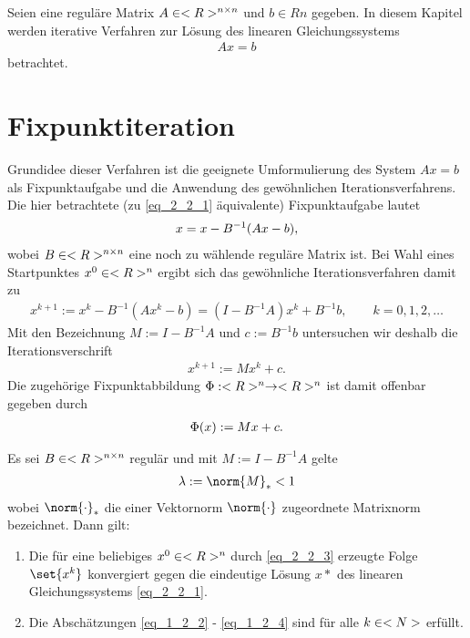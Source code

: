 Seien eine reguläre Matrix $A \in <R>^{n \times n}$ und $b \in Rn$ gegeben. In diesem Kapitel werden iterative Verfahren zur Lösung des linearen Gleichungssystems
\begin{align}
Ax = b\label{eq_2_2_1}
\end{align}
betrachtet.
\section{Fixpunktiteration}

Grundidee dieser Verfahren ist die geeignete Umformulierung des System $Ax = b$ als Fixpunktaufgabe und die Anwendung des gewöhnlichen Iterationsverfahrens. Die hier betrachtete (zu \eqref{eq_2_2_1} äquivalente) Fixpunktaufgabe lautet
\begin{align}
	x = x - B^{-1}(Ax - b),\notag
\end{align}
wobei $B \in <R>^{n \times n}$ eine noch zu wählende reguläre Matrix ist. Bei Wahl eines Startpunktes $x^0 \in <R>^n$ ergibt sich das gewöhnliche Iterationsverfahren damit zu
\begin{align}
	x^{k+1} := x^{k} - B^{-1}(A x^k -b) = (I - B^{-1}A)x^{k} + B^{-1}b, \qquad k = 0,1,2,\dots \label{eq_2_2_2} %
\end{align}
Mit den Bezeichnung $M := I - B^{-1}A$ und $c:= B^{-1}b$ untersuchen wir deshalb die Iterationsverschrift
\begin{align}
	x^{k+1} := Mx^k + c. \label{eq_2_2_3}
\end{align}
Die zugehörige Fixpunktabbildung $\Phi: <R>^n \to <R>^n$ ist damit offenbar gegeben durch
\begin{align}
	\Phi(x) := Mx + c.\notag
\end{align}
\begin{proposition}
	Es sei $B \in <R>^{n \times n}$ regulär und mit $M:= I - B^{-1}A$ gelte
	\begin{align}
		\lambda := \norm{M}_{\ast} < 1 \label{eq_2_1_4}
	\end{align}
	wobei $\norm{\cdot}_{\ast}$ die einer Vektornorm $\norm{\cdot}$ zugeordnete Matrixnorm bezeichnet. Dann gilt:
	\begin{enumerate} %
		\item Die für eine beliebiges $x^0 \in <R>^n$ durch \eqref{eq_2_2_3} erzeugte Folge $\set{x^k}$ konvergiert gegen die eindeutige Lösung $x*$ des linearen Gleichungssystems \eqref{eq_2_2_1}.
		\item Die Abschätzungen \eqref{eq_1_2_2} - \eqref{eq_1_2_4} sind für alle $k \in <N>$ erfüllt.
	\end{enumerate}
\end{proposition}

